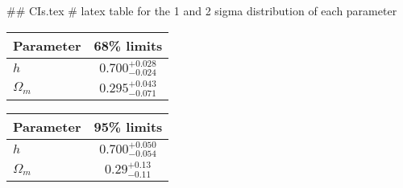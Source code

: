 ## CIs.tex
# latex table for the 1 and 2 sigma distribution of each parameter

\begin{tabular} { l  c}
 Parameter &  68\% limits\\
\hline
{\boldmath$h              $} & $0.700^{+0.028}_{-0.024}   $\\
{\boldmath$\Omega_m       $} & $0.295^{+0.043}_{-0.071}   $\\
\hline
\end{tabular}

\begin{tabular} { l  c}
 Parameter &  95\% limits\\
\hline
{\boldmath$h              $} & $0.700^{+0.050}_{-0.054}   $\\
{\boldmath$\Omega_m       $} & $0.29^{+0.13}_{-0.11}      $\\
\hline
\end{tabular}
